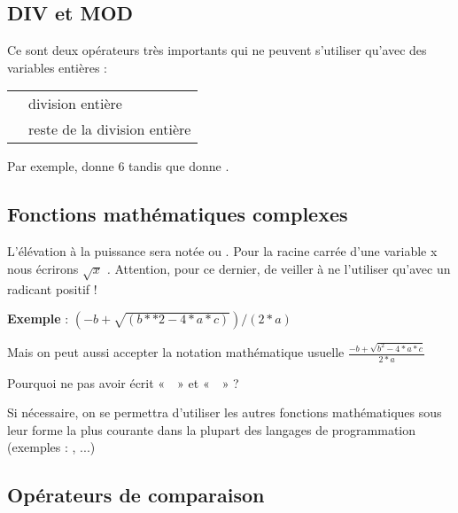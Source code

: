 		\subsection{DIV et MOD}
	
			Ce sont deux opérateurs très importants qui ne peuvent s’utiliser
			qu’avec des variables entières :
	
			\begin{center}
			\tablehead{}
			\begin{supertabular}{m{1cm}|m{12cm}}
			\raggedleft  {} & division entière\\
			\raggedleft  {} & reste de la division entière\\
			\end{supertabular}
			\end{center}
	
			Par exemple,  donne 6 tandis que
			 donne .
	
		\subsection{Fonctions mathématiques complexes}
	
			L’élévation à la puissance sera notée \textstyleCodeInsr{**} ou
			\textstyleCodeInsr{\^{}} . Pour la racine carrée d’une variable x nous
			écrirons  $\sqrt{x}$ \textit{.} Attention, pour ce dernier, de veiller
			à ne l’utiliser qu’avec un radicant positif !
	
			\textbf{Exemple} : 
			$(-b+\sqrt{(b\ast \ast 2-4\ast a\ast c)})/(2\ast a)$
			
			Mais on peut aussi accepter la notation mathématique usuelle
			$\frac{-b+\sqrt{b^{2}-4\ast a\ast c}}{2\ast a}$ 
	
			Pourquoi ne pas avoir écrit «~~» et
			«~~» ?
	
			Si nécessaire, on se permettra d'utiliser les autres
			fonctions mathématiques sous leur forme la plus courante dans la
			plupart des langages de programmation (exemples :
			, ...)
			
		
		\subsection{Opérateurs de comparaison}
	
